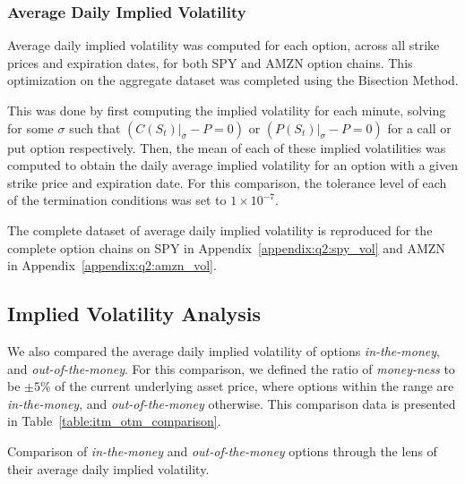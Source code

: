 \documentclass[10pt]{article}
\begin{document}
        \subsubsection{Average Daily Implied Volatility} \label{section:q2:avg_imp_vol}
        
        Average daily implied volatility was computed for each option, across all strike prices and expiration dates, for both SPY and AMZN option chains. This optimization on the aggregate dataset was completed using the Bisection Method.
        
        This was done by first computing the implied volatility for each minute, solving for some $\sigma$ such that ${(C(S_t) |_{\sigma} - P = 0)}$ or ${(P(S_t) |_{\sigma} - P = 0)}$ for a call or put option respectively. Then, the mean of each of these implied volatilities was computed to obtain the daily average implied volatility for an option with a given strike price and expiration date. For this comparison, the tolerance level of each of the termination conditions was set to $1 \times 10^{-7}$.

        The complete dataset of average daily implied volatility is reproduced for the complete option chains on SPY in Appendix~\ref{appendix:q2:spy_vol} and AMZN in Appendix~\ref{appendix:q2:amzn_vol}.


    
    \subsection{Implied Volatility Analysis}

    We also compared the average daily implied volatility of options \textit{in-the-money}, and \textit{out-of-the-money}. For this comparison, we defined the ratio of \textit{money-ness} to be $\pm5\%$ of the current underlying asset price, where options within the range are \textit{in-the-money}, and \textit{out-of-the-money} otherwise. This comparison data is presented in Table~\ref{table:itm_otm_comparison}.

    \begin{table}[h]
        \centering
        \caption{Comparison of \textit{in-the-money} and \textit{out-of-the-money} options through the lens of their average daily implied volatility.}
        \label{table:itm_otm_comparison}
    \end{table}
\end{document}
